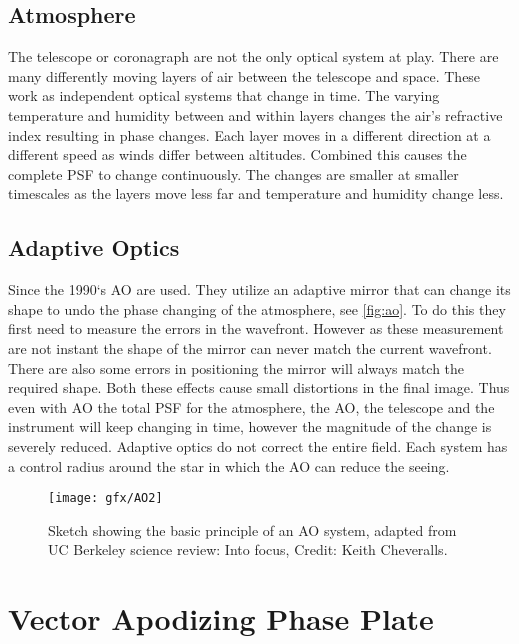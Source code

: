 \subsection{Atmosphere}

The telescope or coronagraph are not the only optical system at play. There are many differently moving layers of air between the telescope and space. These work as independent optical systems that change in time. The varying temperature and humidity between and within layers changes the air's refractive index resulting in phase changes. Each layer moves in a different direction at a different speed as winds differ between altitudes. Combined this causes the complete \ac{PSF} to change continuously. The changes are smaller at smaller timescales as the layers move less far and temperature and humidity change less. 

\subsection{Adaptive Optics}
\label{sec:ao}
Since the 1990‘s \ac{AO} are used. They utilize an adaptive mirror that can change its shape to undo the phase changing of the atmosphere, see \autoref{fig:ao}. To do this they first need to measure the errors in the wavefront. However as these measurement are not instant the shape of the mirror can never match the current wavefront. There are also some errors in positioning the mirror will always match the required shape. Both these effects cause small distortions in the final image. Thus even with \ac{AO} the total \ac{PSF} for the atmosphere, the \ac{AO}, the telescope and the instrument will keep changing in time, however the magnitude of the change is severely reduced. Adaptive optics do not correct the entire field. Each system has a control radius around the star in which the \ac{AO} can reduce the seeing.

\begin{figure}[H]
    \caption{Sketch showing the basic principle of an \ac{AO} system, adapted from UC Berkeley science review: Into focus, Credit: Keith Cheveralls.}
    \centering
    \texttt{[image: gfx/AO2]}
    \label{fig:ao}
\end{figure}





\section{Vector Apodizing Phase Plate}
\label{sec:vapp}


